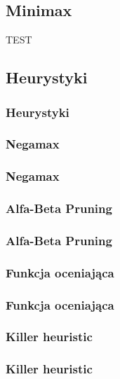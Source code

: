 \documentclass[polish,envcountsect,10pt]{beamer}
\begin{document}
        \subsection{Minimax}
            \begin{frame}
                \begin{algorithm}[H]
                \caption{TEST}
                \end{algorithm}
            \end{frame}
        \subsection{Heurystyki}
            \begin{frame}
                \frametitle{Heurystyki}                
            \end{frame}
            \subsubsection{Negamax}
                \begin{frame}
                    \frametitle{Negamax}
                \end{frame}
            \subsubsection{Alfa-Beta Pruning}
                \begin{frame}
                    \frametitle{Alfa-Beta Pruning}
                \end{frame}
            \subsubsection{Funkcja oceniająca}
                \begin{frame}
                    \frametitle{Funkcja oceniająca}
                \end{frame}
            \subsubsection{Killer heuristic}
                \begin{frame}
                    \frametitle{Killer heuristic}
                \end{frame}
\end{document}
